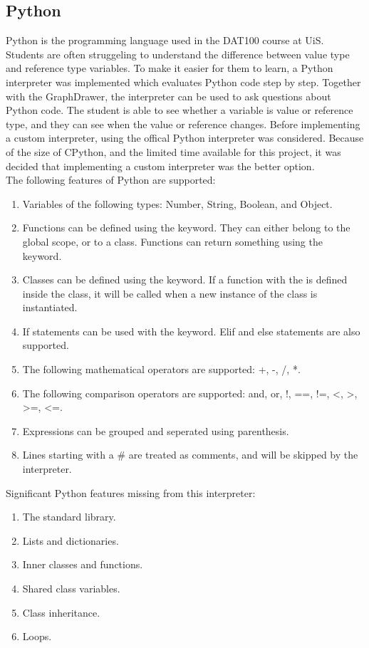 \subsection{Python}
Python is the programming language used in the DAT100 course at UiS. Students are often struggeling to understand the difference between value type and reference type variables. To make it easier for them to learn, a Python interpreter was implemented which evaluates Python code step by step. Together with the GraphDrawer, the interpreter can be used to ask questions about Python code. The student is able to see whether a variable is value or reference type, and they can see when the value or reference changes. Before implementing a custom interpreter, using the offical Python interpreter was considered. Because of the size of CPython, and the limited time available for this project, it was decided that implementing a custom interpreter was the better option.
\\[11pt]
The following features of Python are supported:
\begin{enumerate}
    \item Variables of the following types: Number, String, Boolean, and Object.
    \item Functions can be defined using the  keyword. They can either belong to the global scope, or to a class. Functions can return something using the  keyword.
    \item Classes can be defined using the  keyword. If a function with the  is defined inside the class, it will be called when a new instance of the class is instantiated.
    \item If statements can be used with the  keyword. Elif and else statements are also supported.
    \item The following mathematical operators are supported: +, -, /, *.
    \item The following comparison operators are supported: and, or, !, ==, !=, <, >, >=, <=.
    \item Expressions can be grouped and seperated using parenthesis.
    \item Lines starting with a # are treated as comments, and will be skipped by the interpreter.
\end{enumerate}
Significant Python features missing from this interpreter:
\begin{enumerate}
    \item The standard library.
    \item Lists and dictionaries.
    \item Inner classes and functions.
    \item Shared class variables.
    \item Class inheritance.
    \item Loops.
\end{enumerate}
